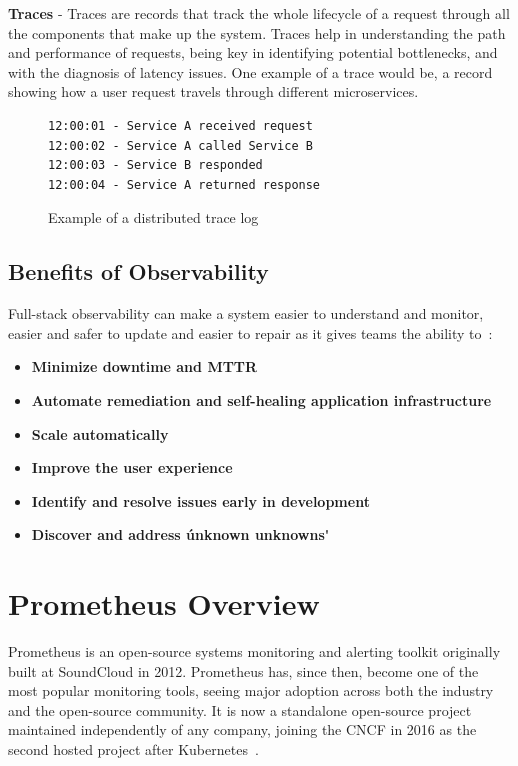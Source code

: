 \textbf{Traces} - Traces are records that track the whole lifecycle of a request through all the components that
make up
the system.
Traces help in understanding the path and performance of requests, being key in identifying potential bottlenecks,
and with the diagnosis of latency issues.
One example of a trace would be, a record showing how a user request travels through different microservices.\\
\begin{figure}[h]
    \centering
    \begin{lstlisting}
12:00:01 - Service A received request
12:00:02 - Service A called Service B
12:00:03 - Service B responded
12:00:04 - Service A returned response
    \end{lstlisting}
    \caption{Example of a distributed trace log}
\end{figure}


\subsection{Benefits of Observability}\label{subsec:benefits-of-observability}

Full-stack observability can make a system easier to understand and monitor, easier and safer to update and easier 
to repair as it gives teams the ability to~\cite{ibm_observability}:

\begin{itemize}
    \item   \textbf{Minimize downtime and \ac{MTTR}}
    \item   \textbf{Automate remediation and self-healing application infrastructure}
    \item   \textbf{Scale automatically}
    \item   \textbf{Improve the user experience}
    \item   \textbf{Identify and resolve issues early in development}
    \item   \textbf{Discover and address \'unknown unknowns\'}
\end{itemize}
\section{Prometheus Overview}\label{sec:prometheus-overview}
Prometheus is an open-source systems monitoring and alerting toolkit originally built at SoundCloud in 2012.
Prometheus has, since then, become one of the most popular monitoring tools, seeing major adoption across both the
industry and the open-source community.
It is now a standalone open-source project maintained independently of any company, joining the \ac{CNCF} in 2016 as
the second hosted project after Kubernetes~\cite{what_is_prometheus}.\\

